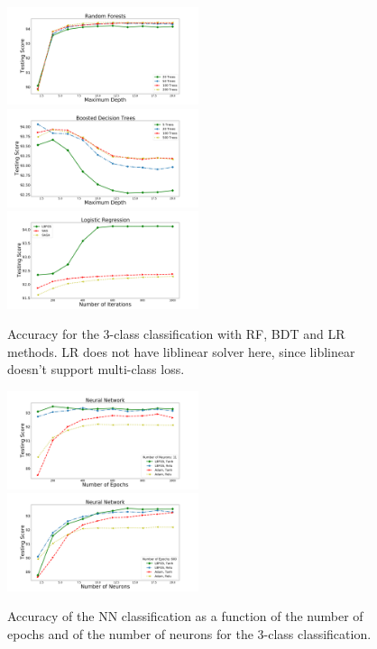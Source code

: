 \begin{figure}[h]
\center
\includegraphics[width=0.5\textwidth]{plots/rf_train_multi.pdf}\\
\includegraphics[width=0.5\textwidth]{plots/bdt_train_multi.pdf}
\includegraphics[width=0.5\textwidth]{plots/lr_train_multi.pdf}
\caption{Accuracy for the 3-class classification with RF, BDT and LR  methods. LR does not have liblinear solver here, since liblinear 
doesn't support multi-class loss.
}
\label{fig:tree_multi}
\end{figure}

\begin{figure}[h]
\center
\includegraphics[width=0.5\textwidth]{plots/nn_epoch_train_multi.pdf}\\
\includegraphics[width=0.5\textwidth]{plots/nn_neuron_train_multi.pdf}
\caption{Accuracy of the NN classification as a function of the number of epochs and of the number of neurons
 for the 3-class classification. 
 }
\label{fig:nets_multi}
\end{figure}



